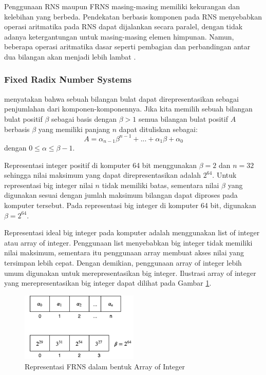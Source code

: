 Penggunaan RNS maupun FRNS masing-masing memiliki kekurangan dan kelebihan yang berbeda. Pendekatan berbasis komponen pada RNS menyebabkan operasi aritmatika pada RNS dapat dijalankan secara paralel, dengan tidak adanya ketergantungan untuk masing-masing elemen himpunan. Namun, beberapa operasi aritmatika dasar seperti pembagian dan perbandingan antar dua bilangan akan menjadi lebih lambat \citep{gpu_bignum}.

\subsubsection{Fixed Radix Number Systems} \label{sec:frns}

\citet{modern_comp_math} menyatakan bahwa sebuah bilangan bulat dapat direpresentasikan sebagai penjumlahan dari komponen-komponennya. Jika kita memilih sebuah bilangan bulat positif $\beta$ sebagai basis dengan $\beta > 1 $ semua bilangan bulat positif $A$ berbasis $\beta$ yang memiliki panjang $n$ dapat dituliskan sebagai:
\begin{equation} \label{eq:frns_rep}
  A = \alpha_{n-1}\beta^{n-1}+...+\alpha_{1}\beta+\alpha_{0}
\end{equation}
dengan $0 \leq \alpha \leq \beta -1$.

Representasi integer positif di komputer 64 bit menggunakan $\beta = 2$ dan $n = 32$ sehingga nilai maksimum yang dapat direpresentasikan adalah $2^{64}$. Untuk representasi big integer nilai $n$ tidak memiliki batas, sementara nilai $\beta$ yang digunakan sesuai dengan jumlah maksimum bilangan dapat diproses pada komputer tersebut. Pada representasi big integer di komputer 64 bit, digunakan $\beta = 2^{64}$.

Representasi ideal big integer pada komputer adalah menggunakan list of integer atau array of integer. Penggunaan list menyebabkan big integer tidak memiliki nilai maksimum, sementara itu penggunaan array membuat akses nilai yang tersimpan lebih cepat. Dengan demikian, penggunaan array of integer lebih umum digunakan untuk merepresentasikan big integer. Ilustrasi array of integer yang merepresentasikan big integer dapat dilihat pada Gambar \ref{fig:frns_ref}.

\begin{figure}[h]
  \centering
  \includegraphics[width=0.5\textwidth]{resources/ch-2/frns-ref.png}
  \caption{Representasi FRNS dalam bentuk Array of Integer}
  \label{fig:frns_ref}
\end{figure}

